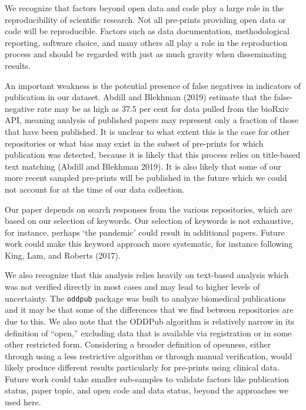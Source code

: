 \documentclass[
]{article}
\begin{document}
We recognize that factors beyond open data and code play a large role in the reproducibility of scientific research. Not all pre-prints providing open data or code will be reproducible. Factors such as data documentation, methodological reporting, software choice, and many others all play a role in the reproduction process and should be regarded with just as much gravity when disseminating results.

An important weakness is the potential presence of false negatives in indicators of publication in our dataset. Abdill and Blekhman (2019) estimate that the false-negative rate may be as high as 37.5 per cent for data pulled from the bioRxiv API, meaning analysis of published papers may represent only a fraction of those that have been published. It is unclear to what extent this is the case for other repositories or what bias may exist in the subset of pre-prints for which publication was detected, because it is likely that this process relies on title-based text matching (Abdill and Blekhman 2019). It is also likely that some of our more recent sampled pre-prints will be published in the future which we could not account for at the time of our data collection.

Our paper depends on search responses from the various repositories, which are based on our selection of keywords. Our selection of keywords is not exhaustive, for instance, perhaps `the pandemic' could result in additional papers. Future work could make this keyword approach more systematic, for instance following King, Lam, and Roberts (2017).

We also recognize that this analysis relies heavily on text-based analysis which was not verified directly in most cases and may lead to higher levels of uncertainty. The \texttt{oddpub} package was built to analyze biomedical publications and it may be that some of the differences that we find between repositories are due to this. We also note that the ODDPub algorithm is relatively narrow in its definition of ``open,'' excluding data that is available via registration or in some other restricted form. Considering a broader definition of openness, either through using a less restrictive algorithm or through manual verification, would likely produce different results particularly for pre-prints using clinical data. Future work could take smaller sub-samples to validate factors like publication status, paper topic, and open code and data status, beyond the approaches we used here.

\newpage
\end{document}
